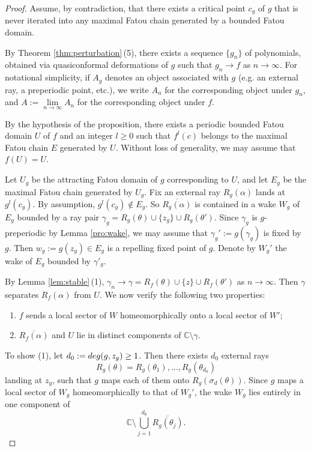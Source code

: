 \documentclass[10pt,a4paper]{amsart}
\def\C{\mbox{$\mathbb C$}}
\def\g{\gamma}
\begin{document}
\begin{proof}
	Assume, by contradiction, that there exists a critical point
	$c_g$ of $g$ that is never iterated into any maximal Fatou chain generated by a bounded Fatou domain.
	
	By Theorem \ref{thm:perturbation}\,(5), there exists a sequence $\{g_n\}$ of polynomials, obtained via quasiconformal deformations of $g$ such that $g_n\to f$ as $n\to\infty$.
	For notational simplicity, if $A_g$ denotes an object associated with $g$ (e.g. an external ray, a preperiodic point, etc.), we write $A_n$ for the corresponding object under $g_n$, and $A:=\lim\limits_{n\to\infty} A_n$ for the corresponding object under $f$.
	
	By the hypothesis of the proposition, there exists a periodic bounded Fatou domain $ U$ of $f$ and an integer $l\geq0$ such that $f^l(c)$ belongs to the maximal Fatou chain $E$ generated by $ U$. Without loss of generality, we may assume that $f( U)= U$.
	
	Let $ U_g$ be the attracting Fatou domain of $g$ corresponding to $ U$, and let $E_g$ be the maximal Fatou chain generated by $ U_g$. Fix an external ray $R_g(\alpha)$ lands at $g^l(c_g)$. By assumption, $g^l(c_g)\notin E_g$. So  $\overline{R_g(\alpha)}$ is contained in a wake $W_g$ of $E_g$ bounded by a ray pair $\g_g=R_g(\theta)\cup \{z_g\}\cup R_g(\theta')$. Since $\g_g$ is $g$-preperiodic by Lemma \ref{pro:wake}, we may assume that
	$\g_g':=g(\g_g)$ is fixed by $g$. Then $w_g:=g(z_g)\in E_g$ is a repelling fixed point of $g$. Denote by $W_g'$ the wake of $E_g$ bounded by $\g'_g$. %
%		
	
	
	By Lemma \ref{lem:stable}\,(1), $\g_n\to \g=R_f(\theta)\cup\{z\}\cup R_f(\theta')$ as $n\to\infty$. Then $\g$ separates $R_f(\alpha)$ from $ U$. We now verify the following two properties:
	\begin{enumerate}
		\item $f$ sends a local sector of $W$ homeomorphically onto a local sector of $W'$;
		\item $\overline{R_f(\alpha)}$ and $ U$ lie in distinct components of $\mathbb{C}\setminus\g.$
	\end{enumerate}
	
	To show (1), let $d_0:={\rm deg}(g, z_g)\geq 1$. Then there exists $d_0$ external rays $$R_g(\theta)=R_g(\theta_1),\ldots, R_g(\theta_{d_0})$$
	landing at $ z_g$, such that $g$ maps each of them onto $R_g(\sigma_d(\theta))$. Since $g$ maps a local sector of $W_g$ homeomorphically to that of $W_g'$, the wake $W_g$ lies entirely in one component of $$\C\setminus\bigcup_{j=1}^{d_0}\overline{R_g(\theta_j)}.$$
	

\end{proof}
\end{document}
